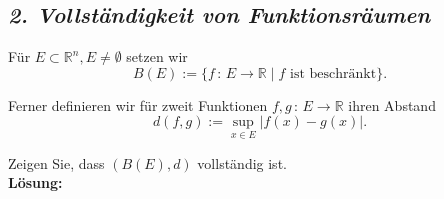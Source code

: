 \subsection*{\itshape 2. Vollständigkeit von Funktionsräumen}

Für $E \subset \mathbb{R}^n, E \not= \emptyset$ setzen wir
$$
    B(E) := \{ f \, : \, E \rightarrow \mathbb{R} \; | \; f \text{ ist beschränkt} \}.
$$

Ferner definieren wir für zweit Funktionen $f,g \, : \, E \rightarrow \mathbb{R}$ ihren Abstand
$$
    d(f,g) := \underset{x \in E}{\sup} |f(x) - g(x)|.
$$

Zeigen Sie, dass $(B(E),d)$ vollständig ist.\\

\textbf{Lösung:}\\

